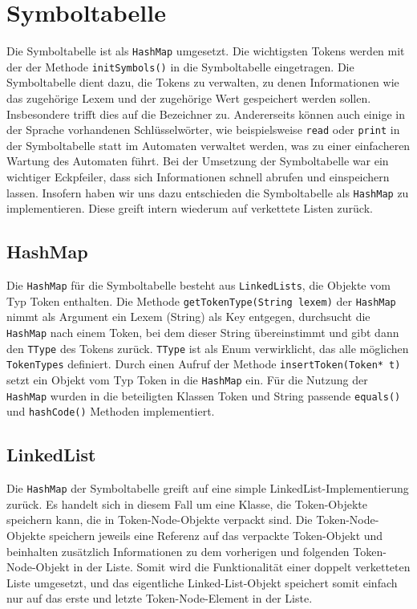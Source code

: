 \documentclass[a4paper,11pt]{report}
\begin{document}
\section{Symboltabelle}
Die Symboltabelle ist als \texttt{HashMap} umgesetzt.
Die wichtigsten Tokens werden mit der der Methode \texttt{initSymbols()} in die Symboltabelle eingetragen.
Die Symboltabelle dient dazu, die Tokens zu verwalten, zu denen Informationen wie das zugehörige Lexem und der zugehörige Wert gespeichert werden sollen.
Insbesondere trifft dies auf die Bezeichner zu.
Andererseits können auch einige in der Sprache vorhandenen Schlüsselwörter, wie beispielsweise \texttt{read} oder \texttt{print} in der Symboltabelle statt im Automaten verwaltet werden, was zu einer einfacheren Wartung des Automaten führt.
Bei der Umsetzung der Symboltabelle war ein wichtiger Eckpfeiler, dass sich Informationen schnell abrufen und einspeichern lassen.
Insofern haben wir uns dazu entschieden die Symboltabelle als \texttt{HashMap} zu implementieren.
Diese greift intern wiederum auf verkettete Listen zurück.

\subsection{HashMap}
Die \texttt{HashMap} für die Symboltabelle besteht aus \texttt{LinkedLists}, die Objekte vom Typ Token enthalten.
Die Methode \texttt{getTokenType(String lexem)} der \texttt{HashMap} nimmt als Argument ein Lexem (String) als Key entgegen, durchsucht die \texttt{HashMap} nach einem Token, bei dem dieser String übereinstimmt und gibt dann den \texttt{TType} des Tokens zurück.
\texttt{TType} ist als Enum verwirklicht, das alle möglichen \texttt{TokenTypes} definiert.
Durch einen Aufruf der Methode \texttt{insertToken(Token* t)} setzt ein Objekt vom Typ Token in die \texttt{HashMap} ein.
Für die Nutzung der \texttt{HashMap} wurden in die beteiligten Klassen Token und String passende \texttt{equals()} und \texttt{hashCode()} Methoden implementiert.

\subsection{LinkedList}
Die \texttt{HashMap} der Symboltabelle greift auf eine simple LinkedList-Implemen\-tier\-ung zurück.
Es handelt sich in diesem Fall um eine Klasse, die Token-Objekte speichern kann, die in Token-Node-Objekte verpackt sind.
Die To\-ken-Node-Objekte speichern jeweils eine Referenz auf das verpackte Token-Objekt und beinhalten zusätzlich Informationen zu dem vorherigen und folgenden Token-Node-Objekt in der Liste.
Somit wird die Funktionalität einer doppelt verketteten Liste umgesetzt, und das eigentliche Linked-List-Objekt speichert somit einfach nur auf das erste und letzte Token-Node-Element in der Liste.
\end{document}
